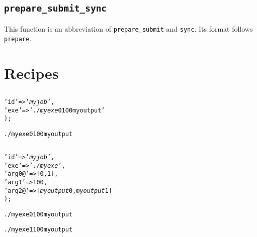 \documentclass[a4paper,10pt]{report}
\begin{document}
\section{\texttt{prepare\_submit\_sync}}

This function is an abbreviation of \texttt{prepare\_submit} and
\texttt{sync}.  Its format follows \texttt{prepare}.

\appendix
\chapter{Recipes}

\section{}

\begin{boxnote}
\begin{alltt}
%myjob = (
    'id' => '\textit{myjob}',
    'exe' => '\textit{./myexe} 0 100 myoutput'
);
\end{alltt}
\end{boxnote}

\begin{boxnote}
\begin{alltt}
./myexe 0 100 myoutput
\end{alltt}
\end{boxnote}

\section{}

\begin{boxnote}
\begin{alltt}
%myjob = (
    'id' => '\textit{myjob}',
    'exe' => '\textit{./myexe}',
    'arg0@' => [0,1],
    'arg1' => 100,
    'arg2@' => [\textit{myoutput}0,\textit{myoutput}1]
);
\end{alltt}
\end{boxnote}

\begin{boxnote}
\begin{alltt}
./myexe 0 100 myoutput
\end{alltt}
\end{boxnote}

\begin{boxnote}
\begin{alltt}
./myexe 1 100 myoutput
\end{alltt}
\end{boxnote}
\end{document}
